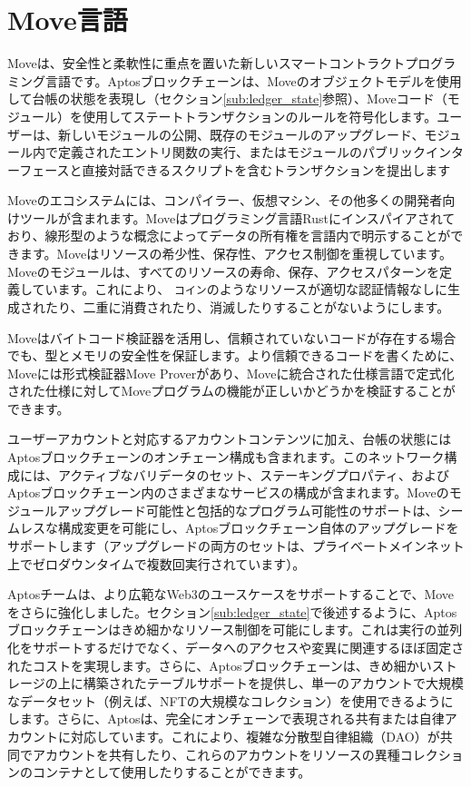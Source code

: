 \documentclass{article}
\begin{document}
\section{Move言語}
\label{sec:move}

Moveは、安全性と柔軟性に重点を置いた新しいスマートコントラクトプログラミング言語です。Aptosブロックチェーンは、Moveのオブジェクトモデルを使用して台帳の状態を表現し（セクション\ref{sub:ledger_state}参照）、Moveコード（モジュール）を使用してステートトランザクションのルールを符号化します。ユーザーは、新しいモジュールの公開、既存のモジュールのアップグレード、モジュール内で定義されたエントリ関数の実行、またはモジュールのパブリックインターフェースと直接対話できるスクリプトを含むトランザクションを提出します

Moveのエコシステムには、コンパイラー、仮想マシン、その他多くの開発者向けツールが含まれます。Moveはプログラミング言語Rustにインスパイアされており、線形型のような概念によってデータの所有権を言語内で明示することができます。Moveはリソースの希少性、保存性、アクセス制御を重視しています。Moveのモジュールは、すべてのリソースの寿命、保存、アクセスパターンを定義しています。これにより、 \texttt{コイン}のようなリソースが適切な認証情報なしに生成されたり、二重に消費されたり、消滅したりすることがないようにします。

Moveはバイトコード検証器を活用し、信頼されていないコードが存在する場合でも、型とメモリの安全性を保証します。より信頼できるコードを書くために、Moveには形式検証器Move Prover\cite{move_prover}があり、Moveに統合された仕様言語で定式化された仕様に対してMoveプログラムの機能が正しいかどうかを検証することができます。

ユーザーアカウントと対応するアカウントコンテンツに加え、台帳の状態にはAptosブロックチェーンのオンチェーン構成も含まれます。このネットワーク構成には、アクティブなバリデータのセット、ステーキングプロパティ、およびAptosブロックチェーン内のさまざまなサービスの構成が含まれます。Moveのモジュールアップグレード可能性と包括的なプログラム可能性のサポートは、シームレスな構成変更を可能にし、Aptosブロックチェーン自体のアップグレードをサポートします（アップグレードの両方のセットは、プライベートメインネット上でゼロダウンタイムで複数回実行されています）。

Aptosチームは、より広範なWeb3のユースケースをサポートすることで、Moveをさらに強化しました。セクション\ref{sub:ledger_state}で後述するように、Aptosブロックチェーンはきめ細かなリソース制御を可能にします。これは実行の並列化をサポートするだけでなく、データへのアクセスや変異に関連するほぼ固定されたコストを実現します。さらに、Aptosブロックチェーンは、きめ細かいストレージの上に構築されたテーブルサポートを提供し、単一のアカウントで大規模なデータセット（例えば、NFTの大規模なコレクション）を使用できるようにします。さらに、Aptosは、完全にオンチェーンで表現される共有または自律アカウントに対応しています。これにより、複雑な分散型自律組織（DAO）が共同でアカウントを共有したり、これらのアカウントをリソースの異種コレクションのコンテナとして使用したりすることができます。
\end{document}
